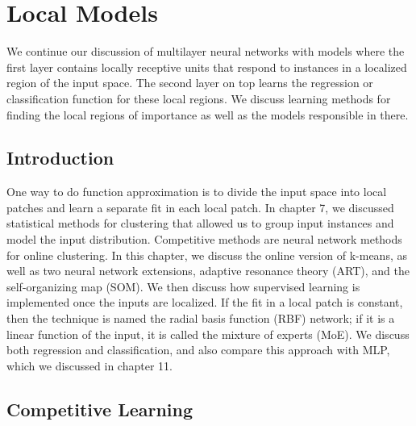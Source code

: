 \chapter{Local Models}
\label{chap:12-local-models}

We continue our discussion of multilayer neural networks with models where the first layer contains locally receptive units that respond to instances in a localized region of the input space. The second layer on top learns the regression or classification function for these local regions. We discuss learning methods for finding the local regions of importance as well as the models responsible in there.

\section{Introduction}

One way to do function approximation is to divide the input space into local patches and learn a separate fit in each local patch. In chapter 7, we discussed statistical methods for clustering that allowed us to group input instances and model the input distribution. Competitive methods are neural network methods for online clustering. In this chapter, we discuss the online version of k-means, as well as two neural network extensions, adaptive resonance theory (ART), and the self-organizing map (SOM). We then discuss how supervised learning is implemented once the inputs are localized. If the fit in a local patch is constant, then the technique is named the radial basis function (RBF) network; if it is a linear function of the input, it is called the mixture of experts (MoE). We discuss both regression and classification, and also compare this approach with MLP, which we discussed in chapter 11.

\section{Competitive Learning}

